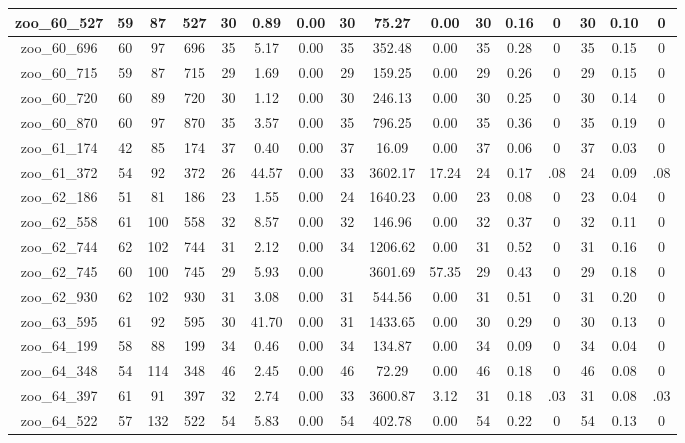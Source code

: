 \begin{landscape}
\begin{longtable}{|c|c|c|c|c|c|c|c|c|c|c|c|c|c|c|c|}
zoo\_60\_527 & 59 & 87 & 527 & 30 & 0.89 & 0.00 & 30 & 75.27 & 0.00 & 30 & 0.16 & 0 & 30 & 0.10 & 0 \\ \hline 
zoo\_60\_696 & 60 & 97 & 696 & 35 & 5.17 & 0.00 & 35 & 352.48 & 0.00 & 35 & 0.28 & 0 & 35 & 0.15 & 0 \\ \hline 
zoo\_60\_715 & 59 & 87 & 715 & 29 & 1.69 & 0.00 & 29 & 159.25 & 0.00 & 29 & 0.26 & 0 & 29 & 0.15 & 0 \\ \hline 
zoo\_60\_720 & 60 & 89 & 720 & 30 & 1.12 & 0.00 & 30 & 246.13 & 0.00 & 30 & 0.25 & 0 & 30 & 0.14 & 0 \\ \hline 
zoo\_60\_870 & 60 & 97 & 870 & 35 & 3.57 & 0.00 & 35 & 796.25 & 0.00 & 35 & 0.36 & 0 & 35 & 0.19 & 0 \\ \hline 
zoo\_61\_174 & 42 & 85 & 174 & 37 & 0.40 & 0.00 & 37 & 16.09 & 0.00 & 37 & 0.06 & 0 & 37 & 0.03 & 0 \\ \hline 
zoo\_61\_372 & 54 & 92 & 372 & 26 & 44.57 & 0.00 & 33 & 3602.17 & 17.24 & 24 & 0.17 & .08 & 24 & 0.09 & .08 \\ \hline 
zoo\_62\_186 & 51 & 81 & 186 & 23 & 1.55 & 0.00 & 24 & 1640.23 & 0.00 & 23 & 0.08 & 0 & 23 & 0.04 & 0 \\ \hline 
zoo\_62\_558 & 61 & 100 & 558 & 32 & 8.57 & 0.00 & 32 & 146.96 & 0.00 & 32 & 0.37 & 0 & 32 & 0.11 & 0 \\ \hline 
zoo\_62\_744 & 62 & 102 & 744 & 31 & 2.12 & 0.00 & 34 & 1206.62 & 0.00 & 31 & 0.52 & 0 & 31 & 0.16 & 0 \\ \hline 
zoo\_62\_745 & 60 & 100 & 745 & 29 & 5.93 & 0.00 &  & 3601.69 & 57.35 & 29 & 0.43 & 0 & 29 & 0.18 & 0 \\ \hline 
zoo\_62\_930 & 62 & 102 & 930 & 31 & 3.08 & 0.00 & 31 & 544.56 & 0.00 & 31 & 0.51 & 0 & 31 & 0.20 & 0 \\ \hline 
zoo\_63\_595 & 61 & 92 & 595 & 30 & 41.70 & 0.00 & 31 & 1433.65 & 0.00 & 30 & 0.29 & 0 & 30 & 0.13 & 0 \\ \hline 
zoo\_64\_199 & 58 & 88 & 199 & 34 & 0.46 & 0.00 & 34 & 134.87 & 0.00 & 34 & 0.09 & 0 & 34 & 0.04 & 0 \\ \hline 
zoo\_64\_348 & 54 & 114 & 348 & 46 & 2.45 & 0.00 & 46 & 72.29 & 0.00 & 46 & 0.18 & 0 & 46 & 0.08 & 0 \\ \hline 
zoo\_64\_397 & 61 & 91 & 397 & 32 & 2.74 & 0.00 & 33 & 3600.87 & 3.12 & 31 & 0.18 & .03 & 31 & 0.08 & .03 \\ \hline 
zoo\_64\_522 & 57 & 132 & 522 & 54 & 5.83 & 0.00 & 54 & 402.78 & 0.00 & 54 & 0.22 & 0 & 54 & 0.13 & 0 \\ \hline 

\end{longtable}
\end{landscape}
